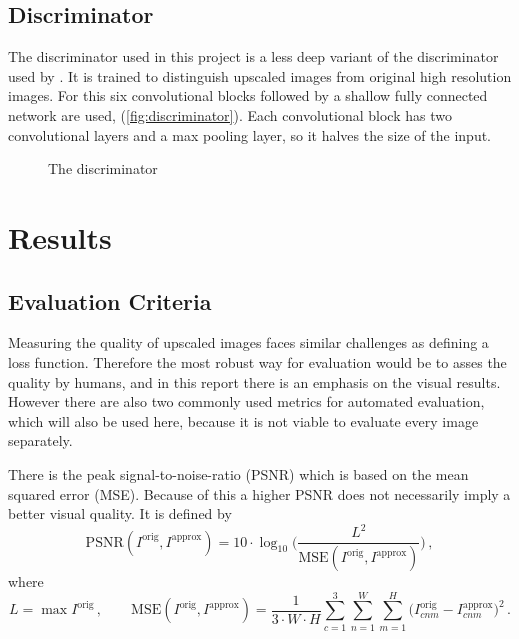 \documentclass{scrartcl}
\begin{document}
\subsection{Discriminator}

The discriminator used in this project is a less deep variant of the discriminator used by \textcite{stylegan0}.
It is trained to distinguish upscaled images from original high resolution images.
For this six convolutional blocks followed by a shallow fully connected network are used, (\autoref{fig:discriminator}).
Each convolutional block has two convolutional layers and a max pooling layer, so it halves the size of the input.

\begin{figure}
	\begin{center}
		
		\caption{The discriminator}
		\label{fig:discriminator}
	\end{center}
\end{figure}

\section{Results}

\subsection{Evaluation Criteria}

Measuring the quality of upscaled images faces similar challenges as defining a loss function.
Therefore the most robust way for evaluation would be to asses the quality by humans, and in this report there is an emphasis on the visual results.
However there are also two commonly used metrics for automated evaluation, which will also be used here, because it is not viable to evaluate every image separately.

There is the peak signal-to-noise-ratio (PSNR) which is based on the mean squared error (MSE).
Because of this a higher PSNR does not necessarily imply a better visual quality.
It is defined by
\[
	\mathrm{PSNR}(I^{\mathrm{orig}}, I^{\mathrm{approx}})
	= 10\cdot \log_{10}\Big(\frac{L^2}{\mathrm{MSE}(I^{\mathrm{orig}}, I^{\mathrm{approx}})}\Big)
	\,,
\]
where
\[
	L = \max I^{\mathrm{orig}}\,,
	\qquad
	\mathrm{MSE}(I^{\mathrm{orig}}, I^{\mathrm{approx}})
	= \frac{1}{3\cdot W \cdot H} \sum_{c=1}^3\sum_{n=1}^W\sum_{m=1}^H \Big(I^{\mathrm{orig}}_{cnm} - I^{\mathrm{approx}}_{cnm}\Big)^2
	\,.
\]
\end{document}
